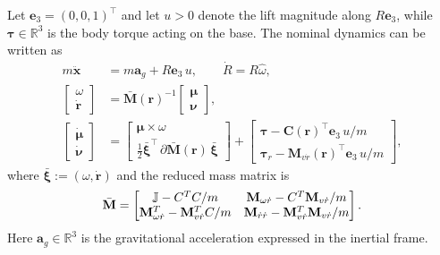 \documentclass[letterpaper, 10 pt, conference]{ieeeconf}  %
\newcommand{\0}{\matr{0}}
\begin{document}
Let $\mathbf e_3=(0,0,1)^\top$ and let $u>0$ denote the lift magnitude along $R\mathbf e_3$, while
$\boldsymbol{\tau}\in\mathbb R^3$ is the body torque acting on the base. The nominal dynamics can be written as
\begin{align}
m\ddot{\mathbf x} &= m\mathbf a_g + R\mathbf e_3\,u, 
\qquad \dot R = R\hat\omega,
\label{eq:nom_trans_rot}\\
\begin{bmatrix}\omega\\ \dot{\mathbf r}\end{bmatrix}
&= \bar{\mathbf M}(\mathbf r)^{-1}\begin{bmatrix}\boldsymbol{\mu}\\ \boldsymbol{\nu}\end{bmatrix},
\label{eq:nom_kin_coup}\\
\begin{bmatrix}\dot{\boldsymbol{\mu}}\\ \dot{\boldsymbol{\nu}}\end{bmatrix}
&=
\begin{bmatrix}
\boldsymbol{\mu}\times\omega\\[1mm]
\frac{1}{2}\bar{\boldsymbol{\xi}}^{\!\top}\,\partial \bar{\mathbf M}(\mathbf r)\,\bar{\boldsymbol{\xi}}
\end{bmatrix}
+
\begin{bmatrix}
\boldsymbol{\tau} - \mathbf C(\mathbf r)^{\!\top} \mathbf e_3\,u/m\\[1mm]
\boldsymbol{\tau}_r - \mathbf M_{v\dot r}(\mathbf r)^{\!\top}\mathbf e_3\,u/m
\end{bmatrix},
\label{eq:nom_momentum}
\end{align}
where $\bar{\boldsymbol{\xi}}:=(\omega,\dot{\mathbf r})$ and the reduced mass matrix is
\begin{equation}
    \bar{\bf{M}}=\begin{bmatrix}
    \mathbb{J}-C^{T}C/m & \mathbf{M}_{\omega\dot{r}}-C^{T}\mathbf{M}_{v\dot{r}}/m\\
   \mathbf{M}_{\omega\dot{r}}^{T}-\mathbf{M}_{v\dot{r}}^{T}C/m& \mathbf{M}_{\dot{r}\dot{r}}-\mathbf{M}_{v\dot{r}}^{T}\mathbf{M}_{v\dot{r}}/m
    \end{bmatrix}.
\end{equation}
Here $\mathbf a_g\in\mathbb R^3$ is the gravitational acceleration expressed in the inertial frame.
\end{document}
